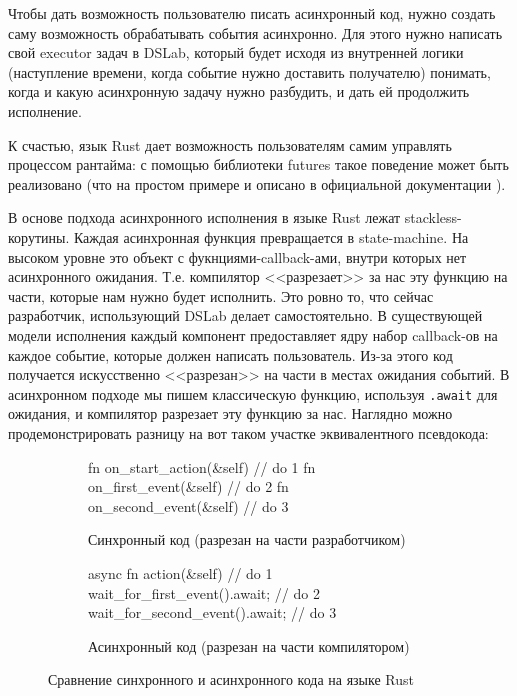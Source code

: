 Чтобы дать возможность пользователю писать асинхронный код, нужно создать саму возможность обрабатывать события асинхронно. Для этого нужно написать свой executor задач в DSLab, который будет исходя из внутренней логики (наступление времени, когда событие нужно доставить получателю) понимать, когда и какую асинхронную задачу нужно разбудить, и дать ей продолжить исполнение. 

К счастью, язык Rust дает возможность пользователям самим управлять процессом рантайма: с помощью библиотеки futures \cite{rust-futures} такое поведение может быть реализовано (что на простом примере и описано в официальной документации \cite{async-book}).

В основе подхода асинхронного исполнения в языке Rust лежат stackless-корутины. Каждая асинхронная функция превращается в state-machine. На высоком уровне это объект с фукнциями-callback-ами, внутри которых нет асинхронного ожидания. Т.е. компилятор <<разрезает>> за нас эту функцию на части, которые нам нужно будет исполнить. Это ровно то, что сейчас разработчик, использующий DSLab делает самостоятельно. В существующей модели исполнения каждый компонент предоставляет ядру набор callback-ов на каждое событие, которые должен написать пользователь. Из-за этого код получается искусственно <<разрезан>> на части в местах ожидания событий. В асинхронном подходе мы пишем классическую функцию, используя \texttt{.await} для ожидания, и компилятор разрезает эту функцию за нас. Наглядно можно продемонстрировать разницу на вот таком участке эквивалентного псевдокода: 

\begin{figure}[H]
    \centering
    \begin{subfigure}[b]{0.45\linewidth}
        \small
        \centering
        \begin{rustcode}
fn on_start_action(&self) {
    // do 1
}
fn on_first_event(&self) {
    // do 2
}
fn on_second_event(&self) {
    // do 3
}
    \end{rustcode}
        \caption{Синхронный код (разрезан на части разработчиком)}
        \label{sync-async-example:sync}
    \end{subfigure}
    \hfill
    \begin{subfigure}[b]{0.51\linewidth}
        \small
        \centering
        \begin{rustcode}
async fn action(&self) {
    // do 1
    wait_for_first_event().await;
    // do 2 
    wait_for_second_event().await;
    // do 3
}
    \end{rustcode}
        \caption{Асинхронный код (разрезан на части компилятором)}
        \label{sync-async-example:async}
    \end{subfigure}
\caption{Сравнение синхронного и асинхронного кода на языке Rust}
\label{sync-async-example}
\end{figure}

